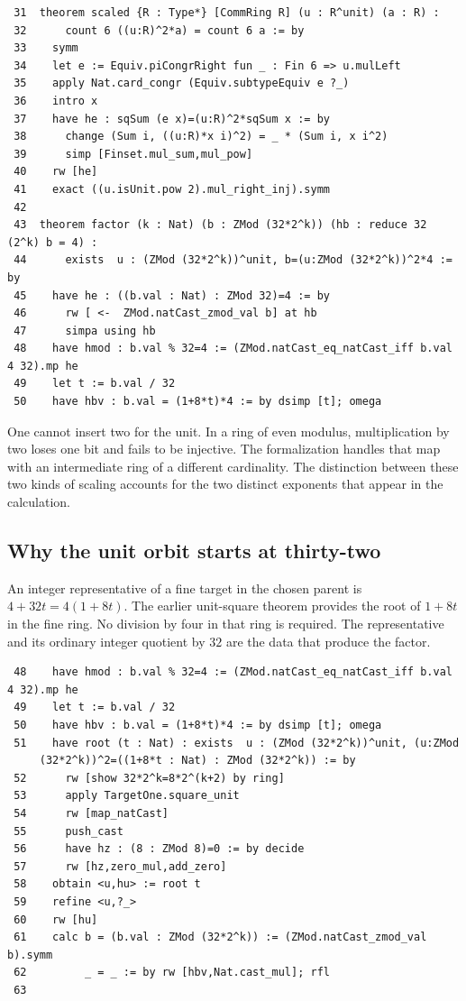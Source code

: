 \documentclass[12pt,letterpaper]{article}
\begin{document}
{\fontsize{9.2}{11.2}\selectfont\begin{verbatim}
 31  theorem scaled {R : Type*} [CommRing R] (u : R^unit) (a : R) :
 32      count 6 ((u:R)^2*a) = count 6 a := by
 33    symm
 34    let e := Equiv.piCongrRight fun _ : Fin 6 => u.mulLeft
 35    apply Nat.card_congr (Equiv.subtypeEquiv e ?_)
 36    intro x
 37    have he : sqSum (e x)=(u:R)^2*sqSum x := by
 38      change (Sum i, ((u:R)*x i)^2) = _ * (Sum i, x i^2)
 39      simp [Finset.mul_sum,mul_pow]
 40    rw [he]
 41    exact ((u.isUnit.pow 2).mul_right_inj).symm
 42
 43  theorem factor (k : Nat) (b : ZMod (32*2^k)) (hb : reduce 32 (2^k) b = 4) :
 44      exists  u : (ZMod (32*2^k))^unit, b=(u:ZMod (32*2^k))^2*4 := by
 45    have he : ((b.val : Nat) : ZMod 32)=4 := by
 46      rw [ <-  ZMod.natCast_zmod_val b] at hb
 47      simpa using hb
 48    have hmod : b.val % 32=4 := (ZMod.natCast_eq_natCast_iff b.val 4 32).mp he
 49    let t := b.val / 32
 50    have hbv : b.val = (1+8*t)*4 := by dsimp [t]; omega
\end{verbatim}}
One cannot insert two for the unit. In a ring of even modulus, multiplication by two loses one bit and fails to be injective. The formalization handles that map with an intermediate ring of a different cardinality. The distinction between these two kinds of scaling accounts for the two distinct exponents that appear in the calculation.
\clearpage{}\subsection*{Why the unit orbit starts at thirty-two}\label{extract-FourLift48}
An integer representative of a fine target in the chosen parent is $4+32t=4(1+8t)$. The earlier unit-square theorem provides the root of $1+8t$ in the fine ring. No division by four in that ring is required. The representative and its ordinary integer quotient by $32$ are the data that produce the factor.
\par
{\fontsize{9.2}{11.2}\selectfont\begin{verbatim}
 48    have hmod : b.val % 32=4 := (ZMod.natCast_eq_natCast_iff b.val 4 32).mp he
 49    let t := b.val / 32
 50    have hbv : b.val = (1+8*t)*4 := by dsimp [t]; omega
 51    have root (t : Nat) : exists  u : (ZMod (32*2^k))^unit, (u:ZMod
     (32*2^k))^2=((1+8*t : Nat) : ZMod (32*2^k)) := by
 52      rw [show 32*2^k=8*2^(k+2) by ring]
 53      apply TargetOne.square_unit
 54      rw [map_natCast]
 55      push_cast
 56      have hz : (8 : ZMod 8)=0 := by decide
 57      rw [hz,zero_mul,add_zero]
 58    obtain <u,hu> := root t
 59    refine <u,?_>
 60    rw [hu]
 61    calc b = (b.val : ZMod (32*2^k)) := (ZMod.natCast_zmod_val b).symm
 62         _ = _ := by rw [hbv,Nat.cast_mul]; rfl
 63
\end{verbatim}}
\end{document}
